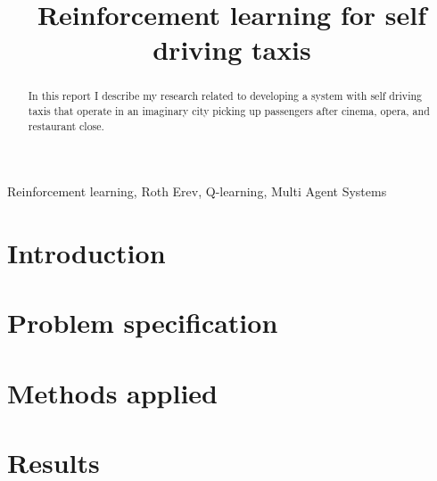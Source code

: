 \documentclass[conference]{IEEEtran}
\begin{document}
  
  \title{Reinforcement learning for self driving taxis}
  
  \author{
  }

\maketitle

\begin{abstract}
  In this report I describe my research related to developing a system with self driving taxis that operate in an imaginary city picking up passengers after cinema, opera, and restaurant close.
\end{abstract}

\begin{IEEEkeywords}
  Reinforcement learning, Roth Erev, Q-learning, Multi Agent Systems
\end{IEEEkeywords}

\section{Introduction}


\section{Problem specification}


\section{Methods applied}


\section{Results}

\end{document}
